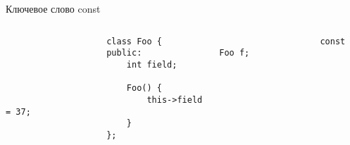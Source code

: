 \documentclass[aspectratio=169,14pt]{beamer}
\begin{document}
    \begin{frame}[fragile]{Ключевое слово const}
        \begin{columns}[T]
            \begin{column}{0.5\textwidth}
                \begin{verbatim}
                    class Foo {
                    public:
                        int field;

                        Foo() {
                            this->field = 37;
                        }
                    };
                \end{verbatim}
            \end{column}
            \begin{column}{0.5\textwidth}
                \begin{verbatim}
                    const Foo f;
                \end{verbatim}
            \end{column}
        \end{columns}
    \end{frame}
\end{document}
